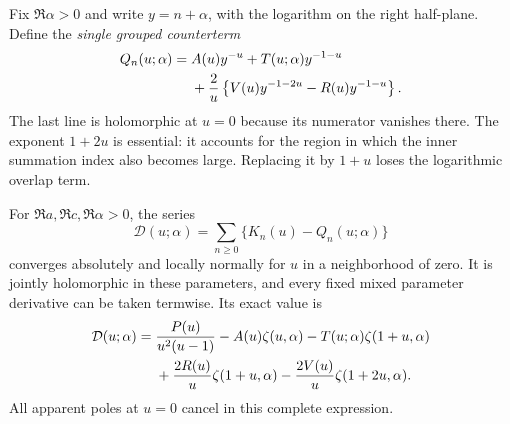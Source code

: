 Fix $\Re\alpha>0$ and write $y=n+\alpha$, with the logarithm on the
right half-plane. Define the \emph{single grouped counterterm}
\begin{align}
 Q_n(u;\alpha)={}&A(u)y^{-u}+T(u;\alpha)y^{-1-u}\notag\\
 &+\frac2u\left\{V(u)y^{-1-2u}-R(u)y^{-1-u}\right\}.
 \label{sr:eq:Q}
\end{align}
The last line is holomorphic at $u=0$ because its numerator vanishes
there. The exponent $1+2u$ is essential: it accounts for the region in
which the inner summation index also becomes large. Replacing it by
$1+u$ loses the logarithmic overlap term.

\begin{theorem}
\label{sr:thm:germ}
For $\Re a,\Re c,\Re\alpha>0$, the series
\begin{equation}\label{sr:eq:D}
 \mathcal D(u;\alpha)=\sum_{n\ge0}\{K_n(u)-Q_n(u;\alpha)\}
\end{equation}
converges absolutely and locally normally for $u$ in a neighborhood of
zero. It is jointly holomorphic in these parameters, and every fixed
mixed parameter derivative can be taken termwise. Its exact value is
\begin{align}
 \mathcal D(u;\alpha)={}&\frac{P(u)}{u^2(u-1)}-A(u)\zeta(u,\alpha)
 -T(u;\alpha)\zeta(1+u,\alpha)\notag\\
 &+\frac{2R(u)}u\zeta(1+u,\alpha)
 -\frac{2V(u)}u\zeta(1+2u,\alpha).
 \label{sr:eq:master}
\end{align}
All apparent poles at $u=0$ cancel in this complete expression.
\end{theorem}

